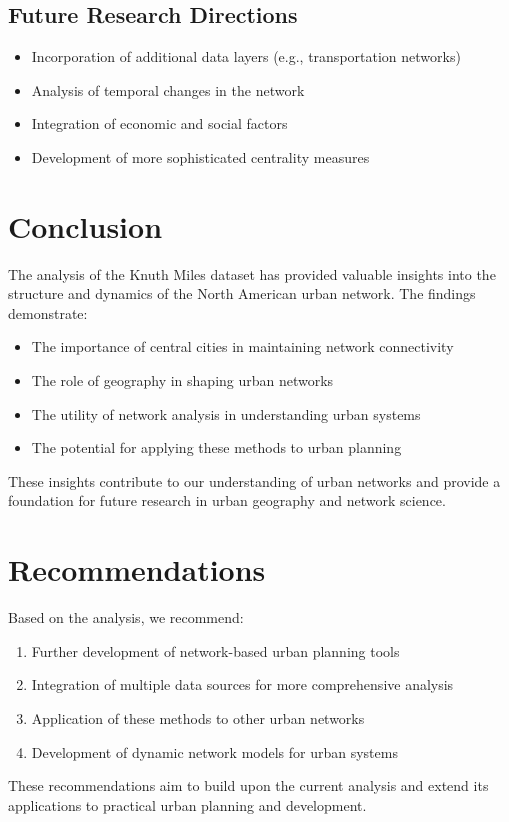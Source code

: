 \subsection{Future Research Directions}
\begin{itemize}
    \item Incorporation of additional data layers (e.g., transportation networks)
    \item Analysis of temporal changes in the network
    \item Integration of economic and social factors
    \item Development of more sophisticated centrality measures
\end{itemize}

\section{Conclusion}
The analysis of the Knuth Miles dataset has provided valuable insights into the structure and dynamics of the North American urban network. The findings demonstrate:

\begin{itemize}
    \item The importance of central cities in maintaining network connectivity
    \item The role of geography in shaping urban networks
    \item The utility of network analysis in understanding urban systems
    \item The potential for applying these methods to urban planning
\end{itemize}

These insights contribute to our understanding of urban networks and provide a foundation for future research in urban geography and network science.

\section{Recommendations}
Based on the analysis, we recommend:

\begin{enumerate}
    \item Further development of network-based urban planning tools
    \item Integration of multiple data sources for more comprehensive analysis
    \item Application of these methods to other urban networks
    \item Development of dynamic network models for urban systems
\end{enumerate}

These recommendations aim to build upon the current analysis and extend its applications to practical urban planning and development. 